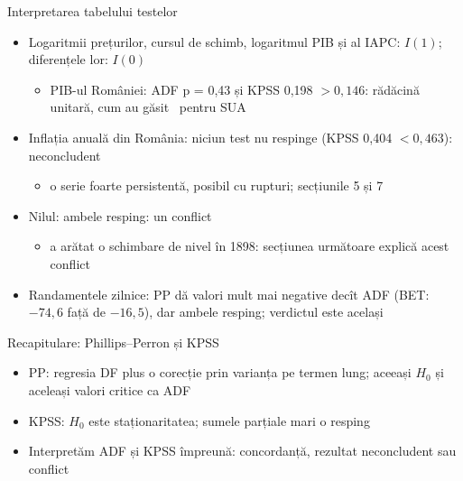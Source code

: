 \begin{frame}{Interpretarea tabelului testelor}
\itemsize{\small}
\begin{itemize}
    \item Logaritmii prețurilor, cursul de schimb, logaritmul PIB și al IAPC: $I(1)$; diferențele lor: $I(0)$
    \begin{itemize}
        \item PIB-ul României: ADF p = 0{,}43 și KPSS 0{,}198 $> 0{,}146$: rădăcină unitară, cum au găsit \ pentru SUA
    \end{itemize}
    \item Inflația anuală din România: niciun test nu respinge (KPSS 0{,}404 $< 0{,}463$): neconcludent
    \begin{itemize}
        \item o serie foarte persistentă, posibil cu rupturi; secțiunile 5 și 7
    \end{itemize}
    \item Nilul: ambele resping: un conflict
    \begin{itemize}
        \item {} a arătat o schimbare de nivel în 1898: secțiunea următoare explică acest conflict
    \end{itemize}
    \item Randamentele zilnice: PP dă valori mult mai negative decît ADF (BET: $\ensuremath{-}74{,}6$ față de $\ensuremath{-}16{,}5$), dar ambele resping; verdictul este același
\end{itemize}
\end{frame}

\begin{frame}{Recapitulare: Phillips--Perron și KPSS}
\itemsize{\small}
\begin{itemize}
    \item PP: regresia DF plus o corecție prin varianța pe termen lung; aceeași $H_0$ și aceleași valori critice ca ADF
    \item KPSS: $H_0$ este staționaritatea; sumele parțiale mari o resping
    \item Interpretăm ADF și KPSS împreună: concordanță, rezultat neconcludent sau conflict
\end{itemize}
\end{frame}


